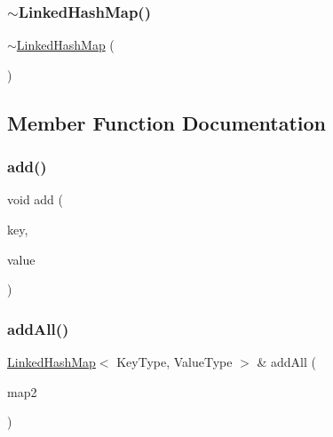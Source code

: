 \mbox{\label{classLinkedHashMap_ac43ee366ad6cddcd132ecc8b0b11318b}} 
\subsubsection{\texorpdfstring{$\sim$\+Linked\+Hash\+Map()}{~LinkedHashMap()}}
{\footnotesize\ttfamily $\sim$\mbox{\hyperlink{classLinkedHashMap}{Linked\+Hash\+Map}} (\begin{DoxyParamCaption}{ }\end{DoxyParamCaption})\hspace{0.3cm}{\ttfamily [virtual]}}



\subsection{Member Function Documentation}
\mbox{\label{classLinkedHashMap_a9129d6095063e7e14d85c627d35086a5}} 
\subsubsection{\texorpdfstring{add()}{add()}}
{\footnotesize\ttfamily void add (\begin{DoxyParamCaption}\item[{const Key\+Type \&}]{key,  }\item[{const Value\+Type \&}]{value }\end{DoxyParamCaption})}

\mbox{\label{classLinkedHashMap_a9e6cd6e8273810ac99a612cdf14f084c}} 
\subsubsection{\texorpdfstring{add\+All()}{addAll()}\hspace{0.1cm}{\footnotesize\ttfamily [1/2]}}
{\footnotesize\ttfamily \mbox{\hyperlink{classLinkedHashMap}{Linked\+Hash\+Map}}$<$ Key\+Type, Value\+Type $>$ \& add\+All (\begin{DoxyParamCaption}\item[{const \mbox{\hyperlink{classLinkedHashMap}{Linked\+Hash\+Map}}$<$ Key\+Type, Value\+Type $>$ \&}]{map2 }\end{DoxyParamCaption})}

